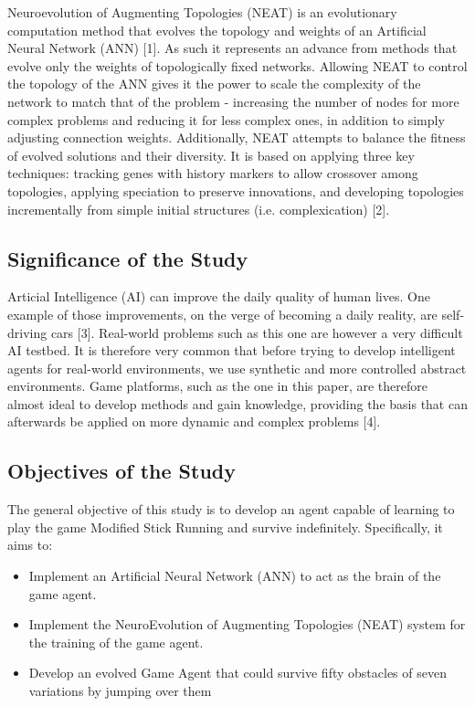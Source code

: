 \documentclass[journal]{IEEEtran}
\begin{document}
Neuroevolution of Augmenting Topologies (NEAT) is an evolutionary computation method that evolves the topology and weights of an Artificial Neural Network (ANN) [1]. As such it represents an advance from methods that evolve only the weights of topologically fixed networks. Allowing NEAT to control the topology of the ANN gives it the power to scale the complexity of the network to match that of the problem - increasing the number of nodes for more complex problems and reducing it for less complex ones, in addition to simply adjusting connection weights. Additionally, NEAT attempts to balance the fitness of evolved solutions and their diversity. It is based on applying three key techniques: tracking genes with history markers to allow crossover among topologies, applying speciation to preserve innovations, and developing topologies incrementally from simple initial structures (i.e. complexication) [2].

\subsection{Significance of the Study}

Articial Intelligence (AI) can improve the daily quality of human lives. One example of those improvements, on the verge of becoming a daily reality, are self-driving cars [3]. Real-world problems such as this one are however a very difficult AI testbed. It is therefore very common that before trying to develop intelligent agents for real-world environments, we use synthetic and more controlled abstract environments. Game platforms, such as the one in this paper, are therefore almost ideal to develop methods and gain knowledge, providing the basis that can afterwards be applied on more dynamic and complex problems [4].

\subsection{Objectives of the Study}

The general objective of this study is to develop an agent capable of learning to play the game Modified Stick Running and survive indefinitely. Specifically, it aims to:

\begin{itemize}

\item Implement an Artificial Neural Network (ANN) to act as the brain of the game agent.
\item Implement the NeuroEvolution of Augmenting Topologies (NEAT) system for the training of the game agent.
\item Develop an evolved Game Agent that could survive fifty obstacles of seven variations by jumping over them

\end{itemize}
\end{document}
